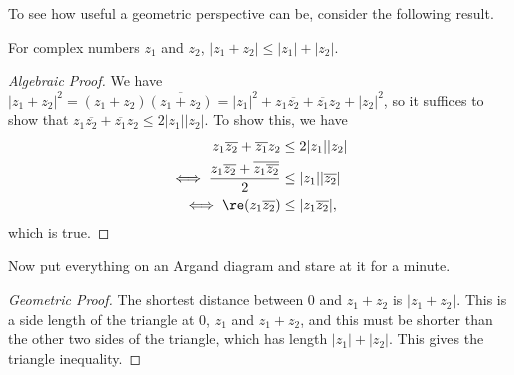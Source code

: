 To see how useful a geometric perspective can be, consider the following result.

\begin{proposition}
	For complex numbers $z_1$ and $z_2$, $|z_1 + z_2| \leq |z_1| + |z_2|$.
\end{proposition}
\begin{proof}[Algebraic Proof]
	We have $|z_1 + z_2|^2 = (z_1 + z_2)\overline{(z_1 + z_2)} = |z_1|^2 + z_1 \overline{z_2} + \overline{z_1} z_2 + |z_2|^2$, so it suffices to show that $z_1 \overline{z_2} + \overline{z_1} z_2 \leq 2 |z_1| |z_2|$. To show this, we have
	\begin{align*}
		z_1 \overline{z_2} + \overline{z_1} z_2 &\leq 2 |z_1| |z_2| \\
\iff 	\frac{z_1 \overline{z_2} + \overline{z_1 \overline{z_2}}}{2} &\leq |z_1| |\overline{z_2}| \\
\iff \re(z_1 \overline{z_2}) &\leq |z_1 \overline{z_2}|,
	\end{align*}
	which is true. 
\end{proof}

Now put everything on an Argand diagram and stare at it for a minute.


\begin{center}
  \end{center}

\begin{proof}[Geometric Proof]
	The shortest distance between $0$ and $z_1 + z_2$ is $|z_1 + z_2|$. This is a side length of the triangle at $0$, $z_1$ and $z_1 + z_2$, and this must be shorter than the other two sides of the triangle, which has length $|z_1| + |z_2|$. This gives the triangle inequality. 
\end{proof}

